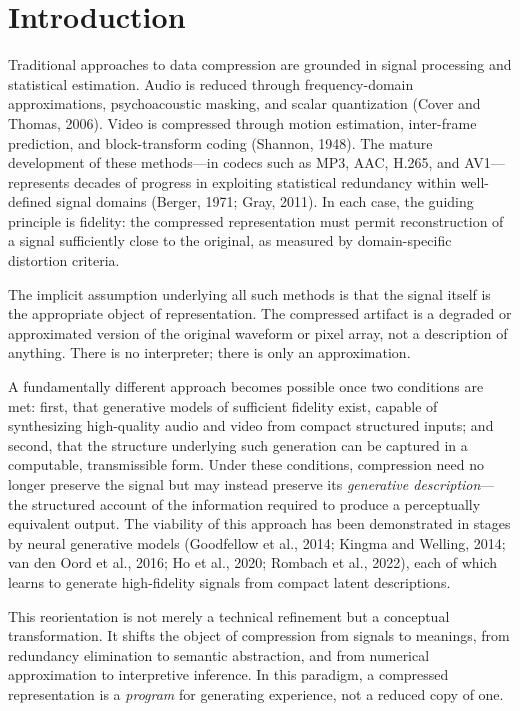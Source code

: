 \documentclass[11pt,a4paper]{article}
\theoremstyle{definition}
\theoremstyle{remark}
\begin{document}
\tableofcontents

\newpage

\section{Introduction}
\label{sec:intro}

Traditional approaches to data compression are grounded in signal processing and statistical estimation. Audio is reduced through frequency-domain approximations, psychoacoustic masking, and scalar quantization (Cover and Thomas, 2006). Video is compressed through motion estimation, inter-frame prediction, and block-transform coding (Shannon, 1948). The mature development of these methods---in codecs such as MP3, AAC, H.265, and AV1---represents decades of progress in exploiting statistical redundancy within well-defined signal domains (Berger, 1971; Gray, 2011). In each case, the guiding principle is fidelity: the compressed representation must permit reconstruction of a signal sufficiently close to the original, as measured by domain-specific distortion criteria.

The implicit assumption underlying all such methods is that the signal itself is the appropriate object of representation. The compressed artifact is a degraded or approximated version of the original waveform or pixel array, not a description of anything. There is no interpreter; there is only an approximation.

A fundamentally different approach becomes possible once two conditions are met: first, that generative models of sufficient fidelity exist, capable of synthesizing high-quality audio and video from compact structured inputs; and second, that the structure underlying such generation can be captured in a computable, transmissible form. Under these conditions, compression need no longer preserve the signal but may instead preserve its \emph{generative description}---the structured account of the information required to produce a perceptually equivalent output. The viability of this approach has been demonstrated in stages by neural generative models (Goodfellow et al., 2014; Kingma and Welling, 2014; van den Oord et al., 2016; Ho et al., 2020; Rombach et al., 2022), each of which learns to generate high-fidelity signals from compact latent descriptions.

This reorientation is not merely a technical refinement but a conceptual transformation. It shifts the object of compression from signals to meanings, from redundancy elimination to semantic abstraction, and from numerical approximation to interpretive inference. In this paradigm, a compressed representation is a \emph{program} for generating experience, not a reduced copy of one.
\end{document}
